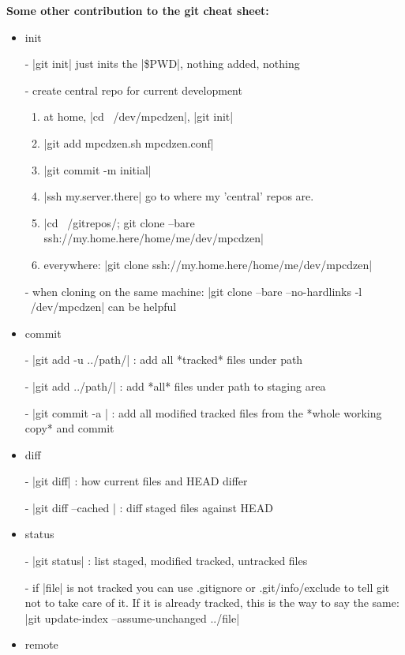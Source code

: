 \noindent
\textbf{Some other contribution to the git cheat sheet:}
\begin{itemize}


\item{init} 

- |git init|  just inits the |\$PWD|, nothing added, nothing

- create central repo for current development\begin{enumerate}
	
	\item at home, |cd ~/dev/mpcdzen|, |git init|
	\item |git add mpcdzen.sh mpcdzen.conf|  
	\item |git commit -m initial|
	\item |ssh my.server.there| go to where my 'central' repos are.
	\item |cd ~/gitrepos/; git clone --bare  ssh://my.home.here/home/me/dev/mpcdzen|
	\item everywhere: |git clone ssh://my.home.here/home/me/dev/mpcdzen| \end{enumerate}

- when cloning on the same machine:
  |git clone --bare --no-hardlinks -l ~/dev/mpcdzen|  can be helpful



\item{commit}

- |git add -u ../path/| : add all *tracked* files under path

- |git add ../path/| : add *all* files under path to staging area

- |git commit -a | : add all modified tracked files from the *whole
  working copy* and commit
  	

\item{diff}
  	
- |git diff| : how current files and HEAD differ

- |git diff --cached | : diff staged files against HEAD


\item{status}

- |git status| : list staged, modified tracked, untracked files

- if |file| is not tracked you can use .gitignore or .git/info/exclude
  to tell git not to take care of it. If it is already tracked, this is
  the way to say the same: |git update-index --assume-unchanged ../file|  

\item{remote}


\end{itemize}
